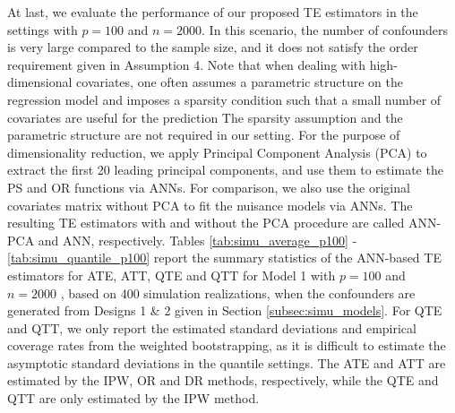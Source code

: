 \documentclass[11pt]{article}
\numberwithin{equation}{section}
\begin{document}
At last, we evaluate the performance of our proposed TE estimators in the settings with $p= 100$ and $n=2000$. In this scenario, the number of confounders is very large compared to the sample size, and it does not satisfy the order requirement given in Assumption 4. Note that when dealing with high-dimensional covariates, one often assumes a parametric structure on the regression model and imposes a sparsity condition such that a small number of covariates are useful for the prediction %
The sparsity assumption and the parametric structure are not required in our setting. For the purpose of dimensionality reduction, we apply Principal Component Analysis (PCA) to extract the first 20 leading principal components, and use them to estimate the PS and OR functions via ANNs. For comparison, we also use the original covariates matrix without PCA to fit the nuisance models via ANNs. The resulting TE estimators with and without the PCA procedure are called ANN-PCA and ANN, respectively. Tables \ref{tab:simu_average_p100} - \ref{tab:simu_quantile_p100}  report the summary statistics of the ANN-based TE estimators for ATE, ATT, QTE and QTT for Model 1 with $p= 100$  and $n= 2000$ , based on 400 simulation realizations, when the confounders are generated from Designs 1 \& 2 given in Section \ref{subsec:simu_models}. For QTE and QTT, we only report the estimated standard deviations and empirical coverage rates from the weighted bootstrapping, as it is difficult to estimate the asymptotic standard deviations in the quantile settings. The ATE and ATT are estimated by the IPW, OR and DR methods, respectively, while the QTE and QTT are only estimated by the IPW method.
\end{document}
